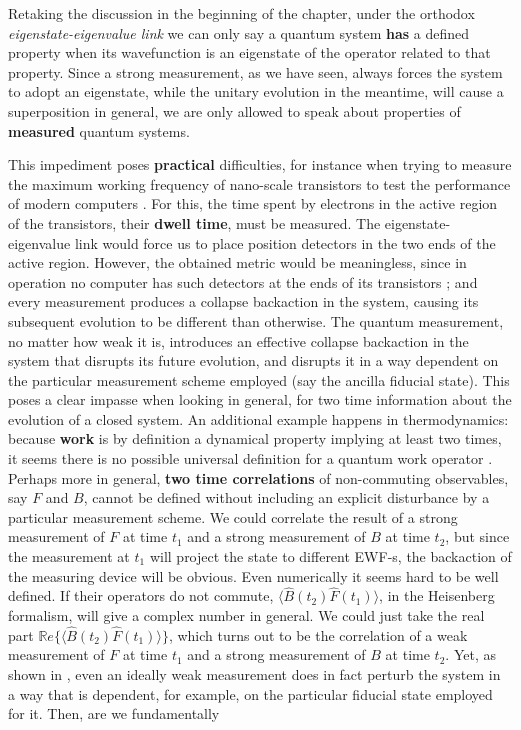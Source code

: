 \documentclass[11pt, a4paper]{article} %
\begin{document}
Retaking the discussion in the beginning of the chapter, under the orthodox {\em eigenstate-eigenvalue link} we can only say a quantum system {\bf has} a defined property when its wavefunction is an eigenstate of the operator related to that property. Since a strong measurement, as we have seen, always forces the system to adopt an eigenstate, while the unitary evolution in the meantime, will cause a superposition in general, we are only allowed to speak about properties of {\bf measured} quantum systems. %

This impediment poses {\bf practical} difficulties, for instance when trying to measure the maximum working frequency of nano-scale transistors to test the performance of modern computers \cite{modern}. For this, the time spent by electrons in the active region of the transistors, their {\bf dwell time}, must be measured. The eigenstate-eigenvalue link would force us to place position detectors in the two ends of the active region. However, the obtained metric would be meaningless, since in operation no computer has such detectors at the ends of its transistors \cite{tunnel1, tunnel2}; and every measurement produces a collapse backaction in the system, causing its subsequent evolution to be different than otherwise. The quantum measurement, no matter how weak it is, introduces an effective collapse backaction in the system that disrupts its future evolution, and disrupts it in a way dependent on the particular measurement scheme employed (say the ancilla fiducial state). This poses a clear impasse when looking in general, for two time information about the evolution of a closed system. An additional example happens in thermodynamics: because {\bf work} is by definition a dynamical property implying at least two times, it seems there is no possible universal definition for a quantum work operator \cite{nogo, workPb1, workPb2}. Perhaps more in general, {\bf two time correlations} of non-commuting observables, say $F$ and $B$, cannot be defined without including an explicit disturbance by a particular measurement scheme. We could correlate the result of a strong measurement of $F$ at time $t_1$ and a strong measurement of $B$ at time $t_2$, but since the measurement at $t_1$ will project the state to different EWF-s, the backaction of the measuring device will be obvious. Even numerically it seems hard to be well defined. If their operators do not commute, $\langle \hat{B}(t_2)\hat{F}(t_1)\rangle$, in the Heisenberg formalism, will give a complex number in general. We could just take the real part $\mathbb{R}e \big\{\langle \hat{B}(t_2)\hat{F}(t_1)\rangle\big\}$, which turns out to be the correlation of a weak measurement \cite{Weak} of $F$ at time $t_1$ and a strong measurement of $B$ at time $t_2$. Yet, as shown in \cite{spin}, even an ideally weak measurement does in fact perturb the system in a way that is dependent, for example, on the particular fiducial state employed for it. Then, are we fundamentally 
\end{document}
